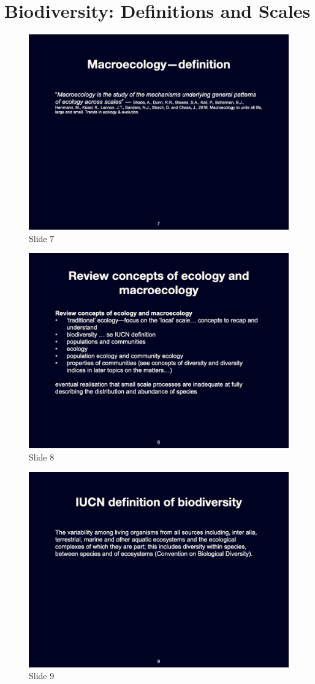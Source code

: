 \documentclass[
  10pt,
]{book}
\begin{document}
\section{Biodiversity: Definitions and
Scales}\label{biodiversity-definitions-and-scales}

\begin{figure}[ht]
\centering
\includegraphics[width=0.8\linewidth]{../images/BDC334/BDC334-007.jpeg}
\caption*{Slide 7}
\end{figure}

\begin{figure}[ht]
\centering
\includegraphics[width=0.8\linewidth]{../images/BDC334/BDC334-008.jpeg}
\caption*{Slide 8}
\end{figure}

\begin{figure}[ht]
\centering
\includegraphics[width=0.8\linewidth]{../images/BDC334/BDC334-009.jpeg}
\caption*{Slide 9}
\end{figure}
\end{document}
